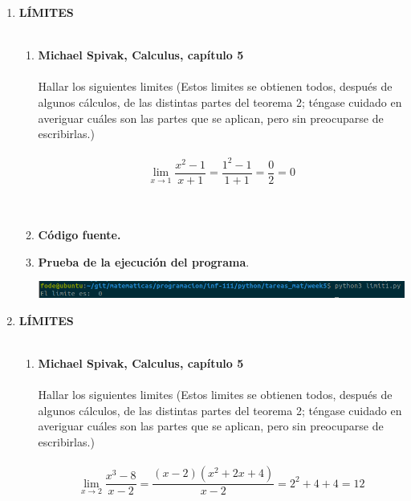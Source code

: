 \begin{enumerate}

\item \textbf{\large LÍMITES}\\\\

    \begin{enumerate}[\bfseries a)]

	\item \textbf{\large Michael Spivak, Calculus, capítulo 5}\\\\
	Hallar los siguientes limites (Estos limites se obtienen todos, después de algunos cálculos, de las distintas partes del teorema 2; téngase cuidado en averiguar cuáles son las partes que se aplican, pero sin preocuparse de escribirlas.)\\\\
	$$\lim\limits_{x \to 1}\dfrac{x^2-1}{x+1} = \dfrac{1^2 - 1}{1 + 1} = \dfrac{0}{2} = 0$$\\\\

	\item \textbf{Código fuente.}\\ 
	    
	    
	    \vspace{.5cm}
	
	\item \textbf{Prueba de la ejecución del programa}.\\
	    \begin{center}
		\includegraphics[scale=.55]{imagenes/tareas_mat/week5/limit1.png}
	    \end{center}

    \end{enumerate}

\newpage

\item \textbf{\large LÍMITES}\\\\

    \begin{enumerate}[\bfseries a)]

	\item \textbf{\large Michael Spivak, Calculus, capítulo 5}\\\\
	Hallar los siguientes limites (Estos limites se obtienen todos, después de algunos cálculos, de las distintas partes del teorema 2; téngase cuidado en averiguar cuáles son las partes que se aplican, pero sin preocuparse de escribirlas.)\\\\
	$$\lim\limits_{x \to 2} \dfrac{x^3 - 8}{x - 2} = \dfrac{(x-2)(x^2+2x+4)}{x-2} = 2^2+4+4 = 12$$\\\\


\end{enumerate}
\end{enumerate}
